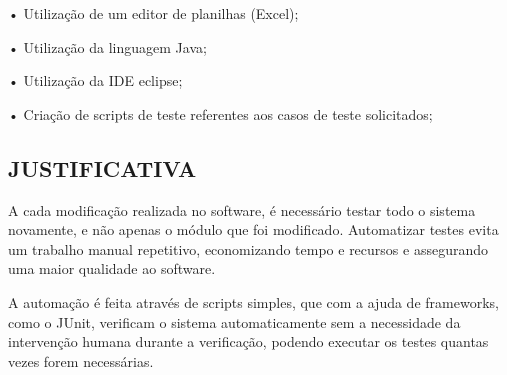 •	Utilização de um editor de planilhas (Excel);

•	Utilização da linguagem Java;

•	Utilização da IDE eclipse;

•	Criação de scripts de teste referentes aos casos de teste solicitados;

\subsection{JUSTIFICATIVA}
A cada modificação realizada no software, é necessário testar todo o sistema novamente, e não apenas o módulo que foi modificado. Automatizar testes evita um trabalho manual repetitivo, economizando tempo e recursos e assegurando uma maior qualidade ao software.

A automação é feita através de scripts simples, que com a ajuda de frameworks, como o JUnit, verificam o sistema automaticamente sem a necessidade da intervenção humana durante a verificação, podendo executar os testes quantas vezes forem necessárias.